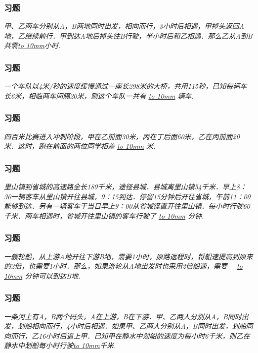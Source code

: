 \begin{frame}
    \frametitle{习题\theframecounter}
    \textit{甲、乙两车分别从A，B两地同时出发，相向而行，3小时后相遇，甲掉头返回A地，乙继续前行．甲到达A地后掉头往B行驶，半小时后和乙相遇．那么乙从A到B共需\underline{\hbox to 10mm{}}小时.}
\end{frame}

\begin{frame}
    \frametitle{习题\theframecounter}
    \textit{一个车队以4米/秒的速度缓慢通过一座长298米的大桥，共用115秒，已知每辆车长6米，相临两车间隔20米，则这个车队一共有 \underline{\hbox to 10mm{}} 辆车.}
\end{frame}


\begin{frame}
    \frametitle{习题\theframecounter}
    \textit{四百米比赛进入冲刺阶段，甲在乙前面30米，丙在丁后面60米，乙在丙前面20米．这时，跑在前面的两位同学相差 \underline{\hbox to 10mm{}} 米.}
\end{frame}

\begin{frame}
    \frametitle{习题\theframecounter}
    \textit{里山镇到省城的高速路全长189千米，途径县城．县城离里山镇54千米．早上8：30一辆客车从里山镇开往县城，9：15到达．停留15分钟后开往省城，午前11：00能够到达．另有一辆客车于当日早上9：00从省城径直开往里山镇．每小时行驶60千米．两车相遇时，省城开往里山镇的客车行驶了 \underline{\hbox to 10mm{}} 分钟.}
\end{frame}

\begin{frame}
    \frametitle{习题\theframecounter}
    \textit{一艘轮船，从上游A地开往下游B地，需要1小时，原路返程时，将船速提高到原来的2倍，也需要1小时．那么，如果游轮从A地出发时也采用2倍船速，需要　 \underline{\hbox to 10mm{}} 分钟可以到达B地.}
\end{frame}

\begin{frame}
    \frametitle{习题\theframecounter}
    \textit{一条河上有A，B两个码头，A在上游，B在下游．甲、乙两人分别从A，B同时出发，划船相向而行，4小时后相遇．如果甲、乙两人分别从A，B同时出发，划船同向而行，乙16小时后追上甲．已知甲在静水中划船的速度为每小时6千米，则乙在静水中划船每小时行驶\underline{\hbox to 10mm{}}千米.}
\end{frame}

